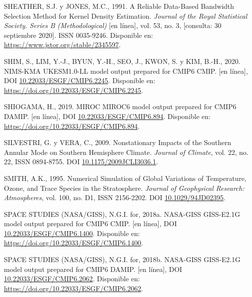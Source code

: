 \documentclass[12pt,oneside,a4paper]{reedthesis}
\newlength{\cslhangindent}
\newenvironment{CSLReferences}[2] %
 {%
  \setlength{\parindent}{0pt}
  \ifodd #1 \everypar{\setlength{\hangindent}{\cslhangindent}}\ignorespaces\fi
  \ifnum #2 > 0
  \setlength{\parskip}{#2\baselineskip}
  \fi
 }%
 {}
\begin{document}
\begin{CSLReferences}{1}{0}
\leavevmode{}%
SHEATHER, S.J. y JONES, M.C., 1991. A {Reliable Data-Based Bandwidth Selection Method} for {Kernel Density Estimation}. \emph{Journal of the Royal Statistical Society. Series B (Methodological)} {[}en línea{]}, vol. 53, no. 3, {[}consulta: 30 septiembre 2020{]}. ISSN 0035-9246. Disponible en: \url{https://www.jstor.org/stable/2345597}.

\leavevmode{}%
SHIM, S., LIM, Y.-J., BYUN, Y.-H., SEO, J., KWON, S. y KIM, B.-H., 2020. NIMS-KMA UKESM1.0-LL model output prepared for CMIP6 CMIP. {[}en línea{]}, DOI \href{https://doi.org/10.22033/ESGF/CMIP6.2245}{10.22033/ESGF/CMIP6.2245}. Disponible en: \url{https://doi.org/10.22033/ESGF/CMIP6.2245}.

\leavevmode{}%
SHIOGAMA, H., 2019. MIROC MIROC6 model output prepared for CMIP6 DAMIP. {[}en línea{]}, DOI \href{https://doi.org/10.22033/ESGF/CMIP6.894}{10.22033/ESGF/CMIP6.894}. Disponible en: \url{https://doi.org/10.22033/ESGF/CMIP6.894}.

\leavevmode{}%
SILVESTRI, G. y VERA, C., 2009. Nonstationary {Impacts} of the {Southern Annular Mode} on {Southern Hemisphere Climate}. \emph{Journal of Climate}, vol. 22, no. 22, ISSN 0894-8755. DOI \href{https://doi.org/10.1175/2009JCLI3036.1}{10.1175/2009JCLI3036.1}.

\leavevmode{}%
SMITH, A.K., 1995. Numerical Simulation of Global Variations of Temperature, Ozone, and Trace Species in the Stratosphere. \emph{Journal of Geophysical Research: Atmospheres}, vol. 100, no. D1, ISSN 2156-2202. DOI \href{https://doi.org/10.1029/94JD02395}{10.1029/94JD02395}.

\leavevmode{}%
SPACE STUDIES (NASA/GISS), N.G.I. for, 2018a. NASA-GISS GISS-E2.1G model output prepared for CMIP6 CMIP. {[}en línea{]}, DOI \href{https://doi.org/10.22033/ESGF/CMIP6.1400}{10.22033/ESGF/CMIP6.1400}. Disponible en: \url{https://doi.org/10.22033/ESGF/CMIP6.1400}.

\leavevmode{}%
SPACE STUDIES (NASA/GISS), N.G.I. for, 2018b. NASA-GISS GISS-E2.1G model output prepared for CMIP6 DAMIP. {[}en línea{]}, DOI \href{https://doi.org/10.22033/ESGF/CMIP6.2062}{10.22033/ESGF/CMIP6.2062}. Disponible en: \url{https://doi.org/10.22033/ESGF/CMIP6.2062}.


\end{CSLReferences}
\end{document}
